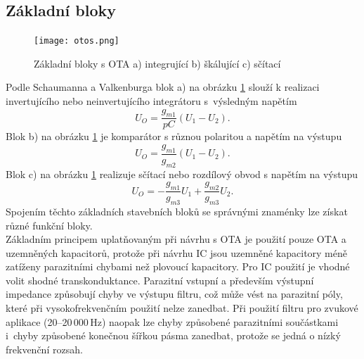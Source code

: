 \subsection{Základní bloky}
\begin{figure}[h]
\centering
\texttt{[image: otos.png]}
\caption[Základní bloky s OTA]{Základní bloky s OTA a) integrující b) škálující c) sčítací \label{s:BLO}}
\end{figure}
\noindent Podle Schaumanna a Valkenburga \cite{13} blok a) na obrázku \ref{s:BLO} slouží k realizaci invertujícího nebo neinvertujícího integrátoru s~výsledným napětím
\begin{equation}
U_O = \frac{g_{m1}}{pC}(U_1 - U_2).
\end{equation}
Blok b) na obrázku \ref{s:BLO} je komparátor s různou polaritou a napětím na výstupu
\begin{equation}
U_O = \frac{g_{m1}}{g_{m2}}(U_1 - U_2).
\end{equation}
Blok c) na obrázku \ref{s:BLO} realizuje sčítací nebo rozdílový obvod s napětím na výstupu
\begin{equation}
U_O = -\frac{g_{m1}}{g_{m3}}U_1 + \frac{g_{m2}}{g_{m3}}U_2.\label{s:BLO3}
\end{equation}
\noindent Spojením těchto základních stavebních bloků se správnými znaménky lze získat různé funkční bloky.\\
Základním principem uplatňovaným při návrhu s OTA je použití pouze OTA a uzemněných kapacitorů, protože při návrhu IC jsou uzemněné kapacitory méně zatíženy parazitními chybami než plovoucí kapacitory. Pro IC použití je vhodné volit shodné transkonduktance. Parazitní vstupní a především výstupní impedance způsobují chyby ve výstupu filtru, což může vést na parazitní póly, které při vysokofrekvenčním použití nelze zanedbat. Při použití filtru pro zvukové aplikace (20--20\,000\,Hz) naopak lze chyby způsobené parazitními součástkami i~chyby způsobené konečnou šířkou pásma zanedbat, protože se jedná o nízký frekvenční rozsah.
